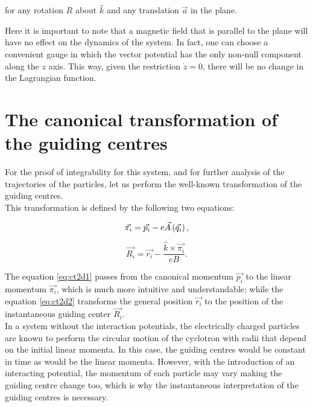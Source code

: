 for any rotation $R$ about $\hat{k}$ and any translation $\vec{a}$ in the plane.

Here it is important to note that a magnetic field that is parallel to the plane will have no effect on the dynamics of the system. In fact, one can choose a convenient gauge in which the vector potential has the only non-null component along the $z$ axis. This way, given the restriction $\dot{z} = 0$, there will be no change in the Lagrangian function.\\

\section{The canonical transformation of the guiding centres}

For the proof of integrability for this system, and for further analysis of the trajectories of the particles, let us perform the well-known transformation of the guiding centres.\\

This transformation is defined by the following two equations:

\begin{equation}
\vec{\pi_i} = \vec{p_i} - e\vec{A}\left( \vec{q_i} \right),
\label{eq:ct2d1}
\end{equation}

\begin{equation}
\vec{R_i} = \vec{r_i} - \frac{\hat{k}\times\vec{\pi_i}}{eB}.
\label{eq:ct2d2}
\end{equation}

The equation \eqref{eq:ct2d1} passes from the canonical momentum $\vec{p_i}$ to the linear momentum $\vec{\pi_i}$, which is much more intuitive and understandable; while the equation \eqref{eq:ct2d2} transforms the general position  $\vec{r_i}$ to the position of the instantaneous guiding center $\vec{R_i}$.\\

In a system without the interaction potentials, the electrically charged particles are known to perform the circular motion of the cyclotron with radii that depend on the initial linear momenta. In this case, the guiding centres would be constant in time as would be the linear momenta. However, with the introduction of an interacting potential, the momentum of each particle may vary making the guiding centre change too, which is why the instantaneous interpretation of the guiding centres is necessary.\\

